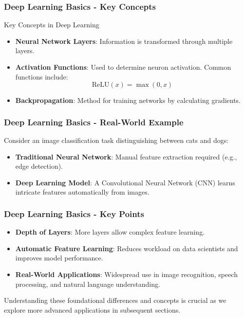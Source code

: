 \documentclass[aspectratio=169]{beamer}
\begin{document}
\begin{frame}[fragile]
    \frametitle{Deep Learning Basics - Key Concepts}
    \begin{block}{Key Concepts in Deep Learning}
        \begin{itemize}
            \item \textbf{Neural Network Layers}: Information is transformed through multiple layers.
            \item \textbf{Activation Functions}: Used to determine neuron activation. Common functions include:
            \begin{equation}
                \text{ReLU}(x) = \max(0, x)
            \end{equation}
            \item \textbf{Backpropagation}: Method for training networks by calculating gradients.
        \end{itemize}
    \end{block}
\end{frame}

\begin{frame}[fragile]
    \frametitle{Deep Learning Basics - Real-World Example}
    Consider an image classification task distinguishing between cats and dogs:
    \begin{itemize}
        \item \textbf{Traditional Neural Network}: Manual feature extraction required (e.g., edge detection).
        \item \textbf{Deep Learning Model}: A Convolutional Neural Network (CNN) learns intricate features automatically from images.
    \end{itemize}
\end{frame}

\begin{frame}[fragile]
    \frametitle{Deep Learning Basics - Key Points}
    \begin{itemize}
        \item \textbf{Depth of Layers}: More layers allow complex feature learning.
        \item \textbf{Automatic Feature Learning}: Reduces workload on data scientists and improves model performance.
        \item \textbf{Real-World Applications}: Widespread use in image recognition, speech processing, and natural language understanding.
    \end{itemize}
    
    Understanding these foundational differences and concepts is crucial as we explore more advanced applications in subsequent sections.
\end{frame}
\end{document}
